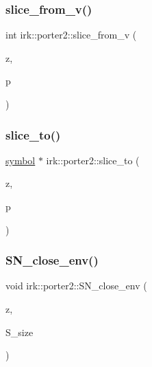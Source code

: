 \mbox{\label{namespaceirk_1_1porter2_a711127812947877f218b3b40fbded030}} 
\subsubsection{\texorpdfstring{slice\+\_\+from\+\_\+v()}{slice\_from\_v()}}
{\footnotesize\ttfamily int irk\+::porter2\+::slice\+\_\+from\+\_\+v (\begin{DoxyParamCaption}\item[{struct \mbox{\hyperlink{structirk_1_1porter2_1_1SN__env}{S\+N\+\_\+env}} $\ast$}]{z,  }\item[{const \mbox{\hyperlink{namespaceirk_1_1porter2_afd04c4eb58a1dabcf8f3ab2d7e9f9ed5}{symbol}} $\ast$}]{p }\end{DoxyParamCaption})}

\mbox{\label{namespaceirk_1_1porter2_a3d0ff0b33c6bed8d07085df31886d1b3}} 
\subsubsection{\texorpdfstring{slice\+\_\+to()}{slice\_to()}}
{\footnotesize\ttfamily \mbox{\hyperlink{namespaceirk_1_1porter2_afd04c4eb58a1dabcf8f3ab2d7e9f9ed5}{symbol}} $\ast$ irk\+::porter2\+::slice\+\_\+to (\begin{DoxyParamCaption}\item[{struct \mbox{\hyperlink{structirk_1_1porter2_1_1SN__env}{S\+N\+\_\+env}} $\ast$}]{z,  }\item[{\mbox{\hyperlink{namespaceirk_1_1porter2_afd04c4eb58a1dabcf8f3ab2d7e9f9ed5}{symbol}} $\ast$}]{p }\end{DoxyParamCaption})}

\mbox{\label{namespaceirk_1_1porter2_ad8c3354818744ae1353046f723e87366}} 
\subsubsection{\texorpdfstring{S\+N\+\_\+close\+\_\+env()}{SN\_close\_env()}}
{\footnotesize\ttfamily void irk\+::porter2\+::\+S\+N\+\_\+close\+\_\+env (\begin{DoxyParamCaption}\item[{struct \mbox{\hyperlink{structirk_1_1porter2_1_1SN__env}{S\+N\+\_\+env}} $\ast$}]{z,  }\item[{int}]{S\+\_\+size }\end{DoxyParamCaption})}

